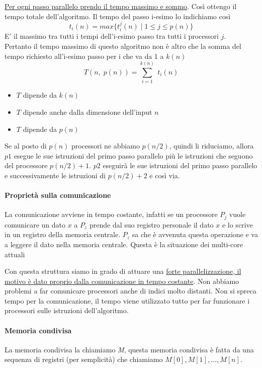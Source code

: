 \uline{Per ogni passo parallelo prendo il tempo massimo e sommo}. Così ottengo il tempo totale dell'algoritmo. Il tempo del passo i-esimo lo indichiamo così
$$t_i(n) = max\{t_i^j(n)\;|\;1 \leq j \leq p(n)\}$$
E' il massimo tra tutti i tempi dell'i-esimo passo tra tutti i processori $j$.\\
Pertanto il tempo massimo di questo algoritmo non è altro che la somma del tempo richiesto all'i-esimo passo per i che va da 1 a $k(n)$
$$T(n,\;p(n)) = \sum_{i=1}^{k(n)}\;t_i(n)$$
\begin{itemize}
    \item $T$ dipende da $k(n)$
    \item $T$ dipende anche dalla dimensione dell'input $n$
    \item $T$ dipende da $p(n)$
\end{itemize}

Se al posto di $p(n)$ processori ne abbiamo $p(n/2)$, quindi li riduciamo, allora $p1$ esegue le sue istruzioni del primo passo parallelo più le istruzioni che seguono del processore $p(n/2) + 1$. $p2$ eseguirà le sue istruzioni del primo passo parallelo e successivamente le istruzioni di $p(n/2) + 2$ e così via.

\paragraph{Proprietà sulla comunicazione} La comunicazione avviene in tempo costante, infatti se un processore $P_j$ vuole comunicare un dato $x$ a $P_z$ prende dal suo registro personale il dato $x$ e lo scrive in un registro della memoria centrale. $P_z$ sa che è avvenuta questa operazione e va a leggere il dato nella memoria centrale. Questa è la situazione dei multi-core attuali

Con questa struttura siamo in grado di attuare una \uline{forte parallelizzazione, il motivo è dato proprio dalla comunicazione in tempo costante}. Non abbiamo problemi a far comunicare processori anche di indici molto distanti. Non si spreca tempo per la comunicazione, il tempo viene utilizzato tutto per far funzionare i processori sulle istruzioni dell'algoritmo.

\paragraph{Memoria condivisa} La memoria condivisa la chiamiamo \textit{M}, questa memoria condivisa è fatta da una sequenza di registri (per semplicità) che chiamiamo $M[0], M[1], \dots, M[n]$.

